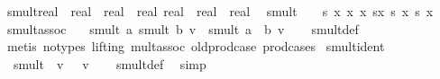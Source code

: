 \begin{isabellebody}
\isanewline
{}\isamarkupfalse%
\ smult{\isacharcolon}{\kern0pt}{\isacharcolon}{\kern0pt}{\isachardoublequoteopen}real\ {\isasymRightarrow}\ {\isacharparenleft}{\kern0pt}real\ {\isasymtimes}\ real\ {\isasymtimes}\ real{\isacharparenright}{\kern0pt}\ {\isasymRightarrow}{\isacharparenleft}{\kern0pt}real\ {\isasymtimes}\ real\ {\isasymtimes}\ real{\isacharparenright}{\kern0pt}{\isachardoublequoteclose}\ \ \isanewline
{\isachardoublequoteopen}smult\ {\isacharequal}{\kern0pt}\ \ {\isacharparenleft}{\kern0pt}{\isasymlambda}\ s\ {\isacharparenleft}{\kern0pt}x{}{\isacharcomma}{\kern0pt}\ x{}{\isacharcomma}{\kern0pt}\ x{}{\isacharparenright}{\kern0pt}{\isachardot}{\kern0pt}\ {\isacharparenleft}{\kern0pt}s{\isacharasterisk}{\kern0pt}x{}{\isacharcomma}{\kern0pt}\ s{\isacharasterisk}{\kern0pt}\ x{}{\isacharcomma}{\kern0pt}\ s{\isacharasterisk}{\kern0pt}\ x{}{\isacharparenright}{\kern0pt}{\isacharparenright}{\kern0pt}{\isachardoublequoteclose}\isanewline
\isanewline
{}\isamarkupfalse%
\ smult{\isacharunderscore}{\kern0pt}assoc{\isacharcolon}{\kern0pt}\ \isanewline
\ \ {\isachardoublequoteopen}smult\ a\ {\isacharparenleft}{\kern0pt}smult\ b\ v{\isacharparenright}{\kern0pt}\ {\isacharequal}{\kern0pt}\ smult\ {\isacharparenleft}{\kern0pt}a\ {\isacharasterisk}{\kern0pt}\ b{\isacharparenright}{\kern0pt}\ v{\isachardoublequoteclose}\isanewline
%
\isadelimproof
\ \ %
\endisadelimproof
%
\isatagproof
{}\isamarkupfalse%
\ smult{\isacharunderscore}{\kern0pt}def\isanewline
\ \ \isamarkupfalse%
\ {\isacharparenleft}{\kern0pt}metis\ {\isacharparenleft}{\kern0pt}no{\isacharunderscore}{\kern0pt}types{\isacharcomma}{\kern0pt}\ lifting{\isacharparenright}{\kern0pt}\ mult{\isachardot}{\kern0pt}assoc\ old{\isachardot}{\kern0pt}prod{\isachardot}{\kern0pt}case\ prod{\isacharunderscore}{\kern0pt}cases{}{\isacharparenright}{\kern0pt}%
\endisatagproof
{\isafoldproof}%
%
\isadelimproof
\isanewline
%
\endisadelimproof
\isanewline
{}\isamarkupfalse%
\ smult{\isacharunderscore}{\kern0pt}ident{\isacharcolon}{\kern0pt}\ \isanewline
\ \ {\isachardoublequoteopen}smult\ {}\ v\ {\isacharequal}{\kern0pt}\ \ v{\isachardoublequoteclose}\isanewline
%
\isadelimproof
\ \ %
\endisadelimproof
%
\isatagproof
{}\isamarkupfalse%
\ smult{\isacharunderscore}{\kern0pt}def\ \isamarkupfalse%
\ simp%
\endisatagproof
{\isafoldproof}%
%
\isadelimproof
\isanewline

\end{isabellebody}
